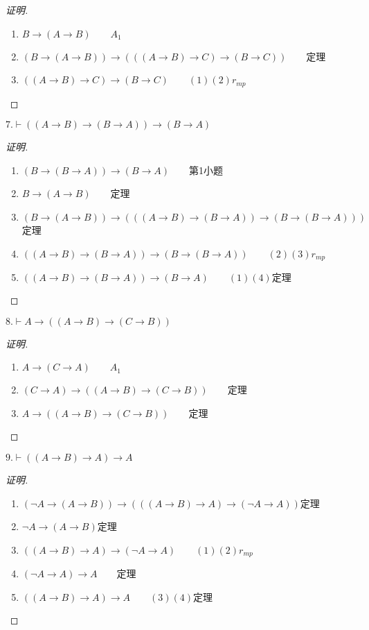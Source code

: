 \documentclass{article}
\begin{document}
\begin{CJK*}{UTF8}{gbsn}
\begin{proof}[证明]$\quad$
\begin{enumerate}
  \item $B\to (A\to B)\qquad A_1$
  \item $(B\to (A\to B))\to (((A\to B)\to C)\to (B\to C))\qquad$定理
  \item $((A\to B)\to C)\to (B\to C)\qquad (1)(2)r_{mp}$
\end{enumerate}  
  

\end{proof}
$7.\vdash ((A\to B)\to (B\to A))\to (B\to A)$

\begin{proof}[证明]$\quad$
\begin{enumerate}
  \item $(B\to (B\to A))\to (B\to A)\quad\quad$第1小题
  \item $B\to (A\to B)\qquad$定理
  \item $(B\to (A\to B))\to (((A\to B)\to(B\to A))\to(B\to (B\to A)))\qquad$定理
  \item $((A\to B)\to(B\to A))\to(B\to (B\to A))\qquad (2)(3)r_{mp}$
  \item $((A\to B)\to (B\to A))\to (B\to A) \qquad (1)(4)\text{定理}$
\end{enumerate}
\end{proof}
$8.\vdash A\to ((A\to B)\to (C\to B))$
\begin{proof}[证明]$\quad$
 \begin{enumerate}
  \item $A\to (C\to A)\qquad A_1$
  \item $(C\to A)\to ((A\to B)\to (C\to B))\qquad$定理
  \item $A\to ((A\to B)\to (C\to B))\qquad$定理
 \end{enumerate} 
\end{proof}
$9.\vdash ((A\to B)\to A)\to A$

\begin{proof}[证明]$\quad$
  \begin{enumerate}
    \item $(\lnot A\to (A\to B))\to (((A\to B)\to A)\to (\lnot A\to A))$定理
    \item $\lnot A\to (A\to B)$定理
    \item $((A\to B)\to A)\to (\lnot A\to A)\qquad(1)(2)r_{mp}$
    \item $(\lnot A\to A) \to A\qquad$定理
    \item $((A\to B)\to A)\to A\qquad(3)(4)$定理
  \end{enumerate}
\end{proof}


\end{CJK*}
\end{document}
